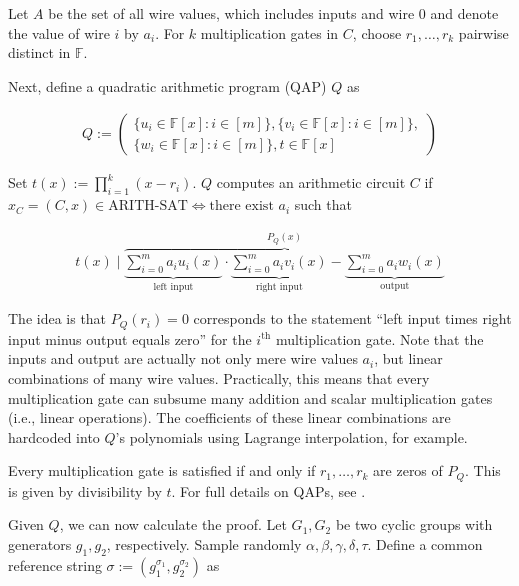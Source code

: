 \documentclass{article}
\begin{document}
Let $A$ be the set of all wire values, which includes inputs and wire $0$ and denote the value of wire $i$ by $a_i$.
For $k$ multiplication gates in $C$, choose $r_1, \ldots, r_k$ pairwise distinct in $\mathbb{F}$.

Next, define a quadratic arithmetic program (QAP) $Q$ as

\begin{align*}
        Q := \left(\begin{aligned}\{u_i \in \mathbb{F}[x] \colon i \in [m]\}, \{v_i \in \mathbb{F}[x] \colon i \in [m]\},\\
        \{w_i \in \mathbb{F}[x] \colon i \in [m]\}, t \in \mathbb{F}[x]\end{aligned}\right)
\end{align*}

Set $t(x) := \prod_{i=1}^k(x-r_i)$.
$Q$ computes an arithmetic circuit $C$ if $x_C = (C,x) \in \text{ARITH-SAT} \iff \text{there exist } a_i$ such that

\begin{align*}
        t(x) \mid \overbrace{\underbrace{\sum_{i=0}^m a_iu_i(x)}_\text{left input} \cdot \underbrace{\sum_{i=0}^m a_iv_i(x)}_\text{right input} - \underbrace{\sum_{i=0}^{m} a_iw_i(x)}_\text{output}}^\text{$P_Q(x)$}
\end{align*}

The idea is that $P_Q(r_i) = 0$ corresponds to the statement ``left input times right input minus output equals zero'' for the $i^\text{th}$ multiplication gate.
Note that the inputs and output are actually not only mere wire values $a_i$, but linear combinations of many wire values.
Practically, this means that every multiplication gate can subsume many addition and scalar multiplication gates (i.e., linear operations).
The coefficients of these linear combinations are hardcoded into $Q$'s polynomials using Lagrange interpolation, for example.

Every multiplication gate is satisfied if and only if $r_1,\ldots,r_k$ are zeros of $P_Q$.
This is given by divisibility by $t$.
For full details on QAPs, see \cite{gennaro:qap}.

Given $Q$, we can now calculate the proof. Let $G_1, G_2$ be two cyclic groups with generators $g_1, g_2$, respectively.
Sample randomly $\alpha, \beta, \gamma, \delta, \tau$. Define a common reference string $\sigma := (g_1^{\sigma_1}, g_2^{\sigma_2})$ as
\end{document}
